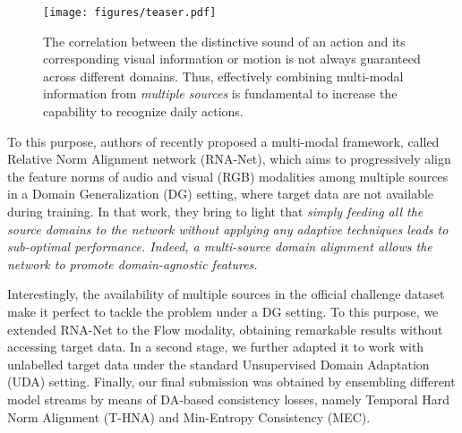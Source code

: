 \begin{figure}[t]
    \centering
    \texttt{[image: figures/teaser.pdf]}
    \caption{The correlation between the distinctive sound of an action and its corresponding visual information or motion is not always guaranteed across different domains. %
    Thus, effectively combining multi-modal information from \emph{multiple sources} is fundamental to increase the capability to recognize daily actions.}
    \label{fig:teaser}
\end{figure}
To this purpose, authors of \cite{planamente2021crossdomain} recently proposed a multi-modal framework, called Relative Norm Alignment network (RNA-Net), which aims to progressively align the feature norms of audio and visual (RGB) modalities among multiple sources in a Domain Generalization (DG) setting, where target data are not available during training. In that work, they bring to light that \emph{simply feeding all the source domains to the network without applying any adaptive techniques leads to sub-optimal performance. Indeed, a multi-source domain alignment allows the network to promote domain-agnostic features. }


Interestingly, the availability of multiple sources in the official challenge dataset make it perfect to tackle the problem under a DG setting. To this purpose, we extended RNA-Net to the Flow modality, obtaining remarkable results without accessing target data. In a second stage, we further adapted it to work with unlabelled target data under the standard Unsupervised Domain Adaptation (UDA) setting. Finally, our final submission was obtained by ensembling different model streams by means of DA-based consistency losses, namely Temporal Hard Norm Alignment (T-HNA) and Min-Entropy Consistency (MEC). 



